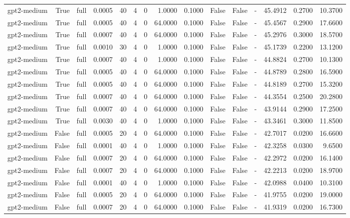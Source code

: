 \begin{tabular}{lrlrrrrrrlllrrr}
gpt2-medium & True & full & 0.0005 & 40 & 4 & 0 & 1.0000 & 0.1000 & False & False & - & 45.4912 & 0.2700 & 10.3700 \\
gpt2-medium & True & full & 0.0005 & 40 & 4 & 0 & 64.0000 & 0.1000 & False & False & - & 45.4567 & 0.2900 & 17.6600 \\
gpt2-medium & True & full & 0.0007 & 40 & 4 & 0 & 64.0000 & 0.1000 & False & False & - & 45.2976 & 0.3000 & 18.5700 \\
gpt2-medium & True & full & 0.0010 & 30 & 4 & 0 & 1.0000 & 0.1000 & False & False & - & 45.1739 & 0.2200 & 13.1200 \\
gpt2-medium & True & full & 0.0007 & 40 & 4 & 0 & 1.0000 & 0.1000 & False & False & - & 44.8824 & 0.2700 & 10.1300 \\
gpt2-medium & True & full & 0.0005 & 40 & 4 & 0 & 64.0000 & 0.1000 & False & False & - & 44.8789 & 0.2800 & 16.5900 \\
gpt2-medium & True & full & 0.0005 & 40 & 4 & 0 & 64.0000 & 0.1000 & False & False & - & 44.8189 & 0.2700 & 15.3200 \\
gpt2-medium & True & full & 0.0007 & 40 & 4 & 0 & 64.0000 & 0.1000 & False & False & - & 44.3554 & 0.2500 & 20.2800 \\
gpt2-medium & True & full & 0.0007 & 40 & 4 & 0 & 64.0000 & 0.1000 & False & False & - & 43.9144 & 0.2900 & 17.2500 \\
gpt2-medium & True & full & 0.0030 & 40 & 4 & 0 & 1.0000 & 0.1000 & False & False & - & 43.3461 & 0.3000 & 11.8500 \\
gpt2-medium & False & full & 0.0005 & 20 & 4 & 0 & 64.0000 & 0.1000 & False & False & - & 42.7017 & 0.0200 & 16.6600 \\
gpt2-medium & False & full & 0.0001 & 40 & 4 & 0 & 1.0000 & 0.1000 & False & False & - & 42.3258 & 0.0300 & 9.6500 \\
gpt2-medium & False & full & 0.0007 & 20 & 4 & 0 & 64.0000 & 0.1000 & False & False & - & 42.2972 & 0.0200 & 16.1400 \\
gpt2-medium & False & full & 0.0007 & 20 & 4 & 0 & 64.0000 & 0.1000 & False & False & - & 42.2213 & 0.0200 & 18.9700 \\
gpt2-medium & False & full & 0.0001 & 40 & 4 & 0 & 1.0000 & 0.1000 & False & False & - & 42.0988 & 0.0400 & 10.3100 \\
gpt2-medium & False & full & 0.0005 & 20 & 4 & 0 & 64.0000 & 0.1000 & False & False & - & 41.9755 & 0.0200 & 19.0000 \\
gpt2-medium & False & full & 0.0007 & 20 & 4 & 0 & 64.0000 & 0.1000 & False & False & - & 41.9319 & 0.0200 & 16.7300 \\

\end{tabular}
